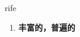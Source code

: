 
\begin{frame}
{\huge rife}
\begin{center}
\begin{enumerate}\Large
  \item \textbf{丰富的，普遍的}
\end{enumerate}
\end{center}
\end{frame}
